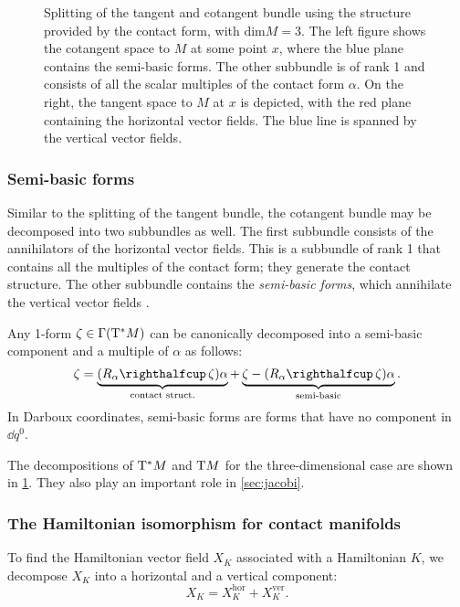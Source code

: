 \begin{figure}[ht!]
    \centering
    
    \caption{Splitting of the tangent and cotangent bundle using the structure provided by the contact form, with \(\text{dim} M = 3\). The left figure shows the cotangent space to \(M\) at some point \(x\), where the blue plane contains the semi-basic forms. The other subbundle is of rank 1 and consists of all the scalar multiples of the contact form \(\alpha\). On the right, the tangent space to \(M\) at \(x\) is depicted, with the red plane containing the horizontal vector fields. The blue line is spanned by the vertical vector fields.}
    \label{fig:contact_spaces}
\end{figure}

\subsubsection{Semi-basic forms} 
Similar to the splitting of the tangent bundle, the cotangent bundle may be decomposed into two subbundles as well. The first subbundle consists of the annihilators of the horizontal vector fields. This is a subbundle of rank 1 that contains all the multiples of the contact form; they generate the contact structure. The other subbundle contains the \emph{semi-basic forms}, which annihilate the vertical vector fields \cite{Libermann1987}.

Any 1-form \(\zeta \in \mathrm{\Gamma}\qty(\mathrm{T}^*M)\) can be canonically decomposed into a semi-basic component and a multiple of \(\alpha\) as follows:
\begin{equation}
    \zeta = \underbrace{(\intpr{R_\alpha}{\zeta})\alpha}_\text{contact struct.} + \underbrace{\zeta - (\intpr{R_\alpha}{\zeta})\alpha}_\text{semi-basic}. 
    \label{eq:form_splitting}
\end{equation}
In Darboux coordinates, semi-basic forms are forms that have no component in \(\dd{q^0}\).

The decompositions of \(\mathrm{T}^*M\) and \(\mathrm{T}M\) for the three-dimensional case are shown in \cref{fig:contact_spaces}. They also play an important role in \cref{sec:jacobi}.

\subsubsection{The Hamiltonian isomorphism for contact manifolds}
To find the Hamiltonian vector field \(X_K\) associated with a Hamiltonian \(K\), we decompose \(X_K\) into a horizontal and a vertical component:
\begin{equation}
     X_K = X_K^\text{hor} + X_K^\text{ver}.
\end{equation}

